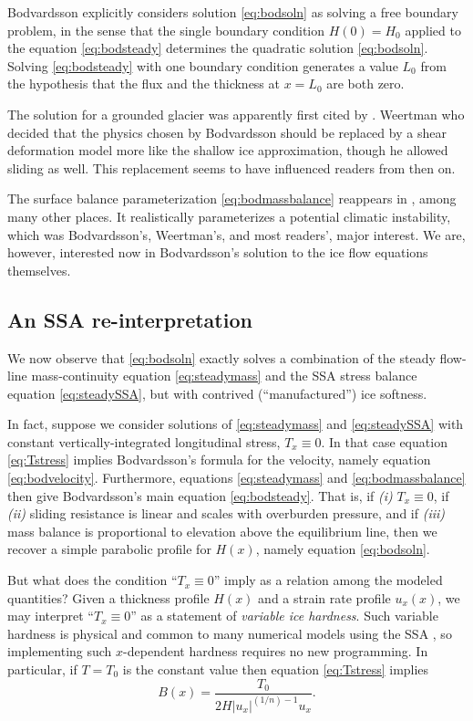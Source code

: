 \documentclass[review,letterpaper]{igs}
\begin{document}
Bodvardsson explicitly considers solution \eqref{eq:bodsoln} as solving a free boundary problem, in the sense that the single boundary condition $H(0)=H_0$ applied to the equation \eqref{eq:bodsteady} determines the quadratic solution \eqref{eq:bodsoln}.  Solving \eqref{eq:bodsteady} with one boundary condition generates a value $L_0$ from the hypothesis that the flux and the thickness at $x=L_0$ are both zero.

The \cite{Bodvardsson} solution for a grounded glacier was apparently first cited by \cite{Weertman61stability}.  Weertman who decided that the physics chosen by Bodvardsson should be replaced by a shear deformation model more like the shallow ice approximation, though he allowed sliding as well.  This replacement seems to have influenced readers from then on.

The surface balance parameterization \eqref{eq:bodmassbalance} reappears in \cite{Weertman61stability}, among many other places.  It realistically parameterizes a potential climatic instability, which was Bodvardsson's, Weertman's, and most readers', major interest.  We are, however, interested now in Bodvardsson's solution to the ice flow equations themselves.


\subsection*{An SSA re-interpretation}  We now observe that \eqref{eq:bodsoln} exactly solves a combination of the steady flow-line mass-continuity equation \eqref{eq:steadymass} and the SSA stress balance equation \eqref{eq:steadySSA}, but with contrived (``manufactured'') ice softness.

In fact, suppose we consider solutions of \eqref{eq:steadymass} and \eqref{eq:steadySSA} with constant vertically-integrated longitudinal stress, $T_x \equiv 0$.  In that case equation \eqref{eq:Tstress} implies Bodvardsson's formula for the velocity, namely equation \eqref{eq:bodvelocity}.  Furthermore, equations \eqref{eq:steadymass} and \eqref{eq:bodmassbalance} then give Bodvardsson's main equation \eqref{eq:bodsteady}.  That is, if \emph{(i)} $T_x \equiv 0$, if \emph{(ii)} sliding resistance is linear and scales with overburden pressure, and if \emph{(iii)} mass balance is proportional to elevation above the equilibrium line, then we recover a simple parabolic profile for $H(x)$, namely equation \eqref{eq:bodsoln}.

But what does the condition ``$T_x\equiv 0$'' imply as a relation among the modeled quantities?  Given a thickness profile $H(x)$ and a strain rate profile $u_x(x)$, we may interpret ``$T_x\equiv 0$'' as a statement of \emph{variable ice hardness}.  Such variable hardness is physical and common to many numerical models using the SSA \citep[for example]{BBssasliding}, so implementing such $x$-dependent hardness requires no new programming.  In particular, if $T=T_0$ is the constant value then equation \eqref{eq:Tstress} implies
\begin{equation}
B(x) = \frac{T_0}{2 H |u_x|^{(1/n)-1} u_x}. \label{eq:hardnessdefine}
\end{equation}
\end{document}
